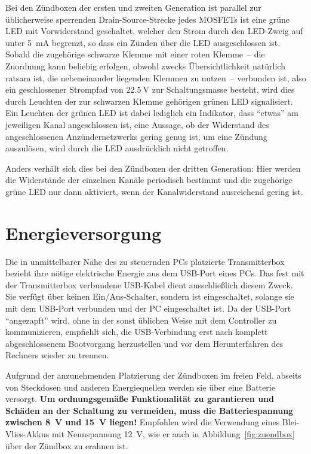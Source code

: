 \documentclass[paper=a4, parskip, numbers=noenddot, toc=listof, headsepline]{scrbook}
\begin{document}
			Bei den Zündboxen der ersten und zweiten Generation ist parallel zur üblicherweise sperrenden Drain-Source-Strecke jedes MOSFETs ist eine grüne LED mit Vorwiderstand geschaltet, welcher den Strom durch den LED-Zweig auf unter \SI{5}{\milli\ampere} begrenzt, so dass ein Zünden über die LED ausgeschlossen ist. Sobald die zugehörige schwarze Klemme mit einer roten Klemme~-- die Zuordnung kann beliebig erfolgen, obwohl zwecks Übersichtlichkeit natürlich ratsam ist, die nebeneinander liegenden Klemmen zu nutzen~-- verbunden ist, also ein geschlossener Strompfad von $\SI{22,5}{\volt}$ zur Schaltungsmasse besteht, wird dies durch Leuchten der zur schwarzen Klemme gehörigen grünen LED signalisiert. Ein Leuchten der grünen LED ist dabei lediglich ein Indikator, dass \enquote{etwas} am jeweiligen Kanal angeschlossen ist, eine Aussage, ob der Widerstand des angeschlossenen Anzündernetzwerks gering genug ist, um eine Zündung auszulösen, wird durch die LED ausdrücklich nicht getroffen.
			
			Anders verhält sich dies bei den Zündboxen der dritten Generation: Hier werden die Widerstände der einzelnen Kanäle periodisch bestimmt und die zugehörige grüne LED nur dann aktiviert, wenn der Kanalwiderstand ausreichend gering ist.

		\section{Energieversorgung}

			Die in unmittelbarer Nähe des zu steuernden PCs platzierte Transmitterbox bezieht ihre nötige elektrische Energie aus dem USB-Port eines PCs. Das fest mit der Transmitterbox verbundene USB-Kabel dient ausschließlich diesem Zweck. Sie verfügt über keinen Ein/Aus-Schalter, sondern ist eingeschaltet, solange sie mit dem USB-Port verbunden und der PC eingeschaltet ist. Da der USB-Port \enquote{angezapft} wird, ohne in der sonst üblichen Weise mit dem Controller zu kommunizieren, empfiehlt sich, die USB-Verbindung erst nach komplett abgeschlossenem Bootvorgang herzustellen und vor dem Herunterfahren des Rechners wieder zu trennen.

			Aufgrund der anzunehmenden Platzierung der Zündboxen im freien Feld, abseits von Steckdosen und anderen Energiequellen werden sie über eine Batterie versorgt. \textbf{Um ordnungsgemäße Funktionalität zu garantieren und Schäden an der Schaltung zu vermeiden, muss die Batteriespannung zwischen \SI{8}{\volt} und \SI{15}{\volt} liegen!} Empfohlen wird die Verwendung eines Blei-Vlies-Akkus mit Nennspannung \SI{12}{\volt}, wie er auch in Abbildung~\ref{fig:zuendbox} über der Zündbox zu erahnen ist.
\end{document}
